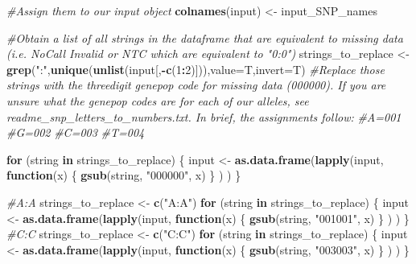 \documentclass[
]{article}
\newenvironment{Shaded}{\begin{snugshade}}{\end{snugshade}}
\newcommand{\CommentTok}[1]{\textcolor[rgb]{0.56,0.35,0.01}{\textit{#1}}}
\newcommand{\ControlFlowTok}[1]{\textcolor[rgb]{0.13,0.29,0.53}{\textbf{#1}}}
\newcommand{\DataTypeTok}[1]{\textcolor[rgb]{0.13,0.29,0.53}{#1}}
\newcommand{\DecValTok}[1]{\textcolor[rgb]{0.00,0.00,0.81}{#1}}
\newcommand{\KeywordTok}[1]{\textcolor[rgb]{0.13,0.29,0.53}{\textbf{#1}}}
\newcommand{\NormalTok}[1]{#1}
\newcommand{\OperatorTok}[1]{\textcolor[rgb]{0.81,0.36,0.00}{\textbf{#1}}}
\newcommand{\StringTok}[1]{\textcolor[rgb]{0.31,0.60,0.02}{#1}}
\begin{document}
\begin{Shaded}
\begin{Highlighting}[]
\CommentTok{#Assign them to our input object}
\KeywordTok{colnames}\NormalTok{(input) <-}\StringTok{ }\NormalTok{input_SNP_names}

\CommentTok{#Obtain a list of all strings in the dataframe that are equivalent to missing data (i.e. NoCall Invalid or NTC which are equivalent to "0:0")}
\NormalTok{strings_to_replace <-}\StringTok{ }\KeywordTok{grep}\NormalTok{(}\StringTok{":"}\NormalTok{,}\KeywordTok{unique}\NormalTok{(}\KeywordTok{unlist}\NormalTok{(input[,}\OperatorTok{-}\KeywordTok{c}\NormalTok{(}\DecValTok{1}\OperatorTok{:}\DecValTok{2}\NormalTok{)])),}\DataTypeTok{value=}\NormalTok{T,}\DataTypeTok{invert=}\NormalTok{T)}
\CommentTok{#Replace those strings with the threedigit genepop code for missing data (000000). If you are unsure what the genepop codes are for each of our alleles, see readme_snp_letters_to_numbers.txt. In brief, the assignments follow: }
\CommentTok{#A=001}
\CommentTok{#G=002}
\CommentTok{#C=003}
\CommentTok{#T=004}

\ControlFlowTok{for}\NormalTok{ (string }\ControlFlowTok{in}\NormalTok{ strings_to_replace) \{ }
\NormalTok{  input <-}\StringTok{ }\KeywordTok{as.data.frame}\NormalTok{(}\KeywordTok{lapply}\NormalTok{(input, }\ControlFlowTok{function}\NormalTok{(x) \{ }
                                \KeywordTok{gsub}\NormalTok{(string, }\StringTok{"000000"}\NormalTok{, x)}
\NormalTok{                                \}}
\NormalTok{                              )}
\NormalTok{                        )}
\NormalTok{  \}}
  
\CommentTok{#A:A}
\NormalTok{strings_to_replace <-}\StringTok{ }\KeywordTok{c}\NormalTok{(}\StringTok{"A:A"}\NormalTok{)}
\ControlFlowTok{for}\NormalTok{ (string }\ControlFlowTok{in}\NormalTok{ strings_to_replace) \{ }
\NormalTok{  input <-}\StringTok{ }\KeywordTok{as.data.frame}\NormalTok{(}\KeywordTok{lapply}\NormalTok{(input, }\ControlFlowTok{function}\NormalTok{(x) \{ }
                                \KeywordTok{gsub}\NormalTok{(string, }\StringTok{"001001"}\NormalTok{, x)}
\NormalTok{                                \}}
\NormalTok{                              )}
\NormalTok{                        )}
\NormalTok{  \}}
\CommentTok{#C:C}
\NormalTok{strings_to_replace <-}\StringTok{ }\KeywordTok{c}\NormalTok{(}\StringTok{"C:C"}\NormalTok{)}
\ControlFlowTok{for}\NormalTok{ (string }\ControlFlowTok{in}\NormalTok{ strings_to_replace) \{ }
\NormalTok{  input <-}\StringTok{ }\KeywordTok{as.data.frame}\NormalTok{(}\KeywordTok{lapply}\NormalTok{(input, }\ControlFlowTok{function}\NormalTok{(x) \{ }
                                \KeywordTok{gsub}\NormalTok{(string, }\StringTok{"003003"}\NormalTok{, x)}
\NormalTok{                                \}}
\NormalTok{                              )}
\NormalTok{                        )}
\NormalTok{  \}}


\end{Highlighting}
\end{Shaded}
\end{document}
